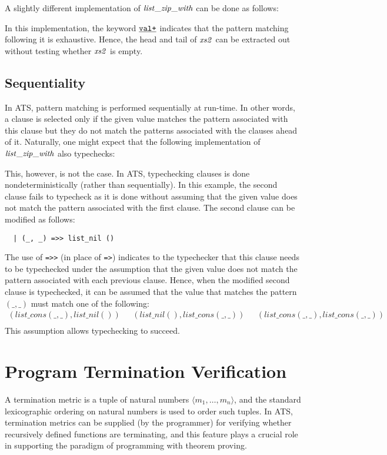 A slightly different implementation of ${\it list\_zip\_with}$ can be
done as follows:

In this implementation, the keyword $\underline{\texttt{val+}}$ indicates that the
pattern matching following it is exhaustive. Hence, the head and tail of
${\it xs2}$ can be extracted out without testing whether ${\it xs2}$ is
empty.

\subsection{Sequentiality}
In ATS, pattern matching is performed sequentially at run-time. In other
words, a clause is selected only if the given value matches the pattern
associated with this clause but they do not match the patterns associated
with the clauses ahead of it. Naturally, one might expect that the
following implementation of ${\it list\_zip\_with}$ also typechecks:

This, however, is not the case. In ATS, typechecking clauses is done
nondeterministically (rather than sequentially). In this example, the
second clause fails to typecheck as it is done without assuming that the
given value does not match the pattern associated with the first clause.
The second clause can be modified as follows:
\begin{verbatim}
  | (_, _) =>> list_nil ()
\end{verbatim}
The use of \verb`=>>` (in place of \verb`=>`) indicates to the typechecker
that this clause needs to be typechecked under the assumption that the
given value does not match the pattern associated with each previous
clause.  Hence, when the modified second clause is typechecked, it can be
assumed that the value that matches the pattern $(\_, \_)$ must match one
of the following:
$$\begin{array}{lll}
(list\_cons(\_,\_), list\_nil ())~~~& 
(list\_nil (), list\_cons(\_,\_))~~~&
(list\_cons(\_, \_), list\_cons(\_,\_)) \\
\end{array}$$
This assumption allows typechecking to succeed.


\section{Program Termination Verification}
A termination metric is a tuple of natural numbers $\langle
m_1,\ldots,m_n\rangle$, and the standard lexicographic ordering on natural
numbers is used to order such tuples.  In ATS, termination metrics can be
supplied (by the programmer) for verifying whether recursively defined
functions are terminating, and this feature plays a crucial role in
supporting the paradigm of programming with theorem proving.

